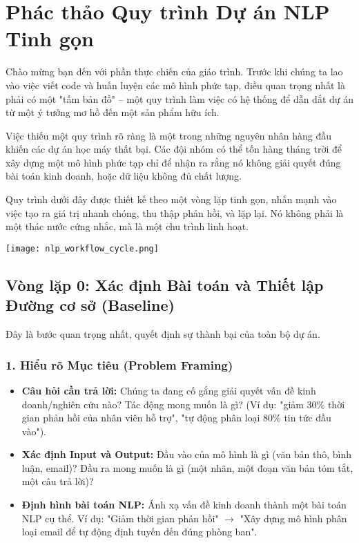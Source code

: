 

\section{Phác thảo Quy trình Dự án NLP Tinh gọn}
\label{sec:nlp_project_workflow}

Chào mừng bạn đến với phần thực chiến của giáo trình. Trước khi chúng ta lao vào việc viết code và huấn luyện các mô hình phức tạp, điều quan trọng nhất là phải có một "tấm bản đồ" -- một quy trình làm việc có hệ thống để dẫn dắt dự án từ một ý tưởng mơ hồ đến một sản phẩm hữu ích.

Việc thiếu một quy trình rõ ràng là một trong những nguyên nhân hàng đầu khiến các dự án học máy thất bại. Các đội nhóm có thể tốn hàng tháng trời để xây dựng một mô hình phức tạp chỉ để nhận ra rằng nó không giải quyết đúng bài toán kinh doanh, hoặc dữ liệu không đủ chất lượng.

Quy trình dưới đây được thiết kế theo một vòng lặp tinh gọn, nhấn mạnh vào việc tạo ra giá trị nhanh chóng, thu thập phản hồi, và lặp lại. Nó không phải là một thác nước cứng nhắc, mà là một chu trình linh hoạt.

\begin{center}
    \texttt{[image: nlp\_workflow\_cycle.png]}
    \label{fig:nlp_workflow_cycle}
\end{center}

\subsection{Vòng lặp 0: Xác định Bài toán và Thiết lập Đường cơ sở (Baseline)}
\label{ssec:workflow_step0}
Đây là bước quan trọng nhất, quyết định sự thành bại của toàn bộ dự án.

\subsubsection{1. Hiểu rõ Mục tiêu (Problem Framing)}
\begin{itemize}
    \item \textbf{Câu hỏi cần trả lời:} Chúng ta đang cố gắng giải quyết vấn đề kinh doanh/nghiên cứu nào? Tác động mong muốn là gì? (Ví dụ: "giảm 30\% thời gian phản hồi của nhân viên hỗ trợ", "tự động phân loại 80\% tin tức đầu vào").
    \item \textbf{Xác định Input và Output:} Đầu vào của mô hình là gì (văn bản thô, bình luận, email)? Đầu ra mong muốn là gì (một nhãn, một đoạn văn bản tóm tắt, một câu trả lời)?
    \item \textbf{Định hình bài toán NLP:} Ánh xạ vấn đề kinh doanh thành một bài toán NLP cụ thể. Ví dụ: "Giảm thời gian phản hồi" $\rightarrow$ "Xây dựng mô hình phân loại email để tự động định tuyến đến đúng phòng ban".
\end{itemize}

